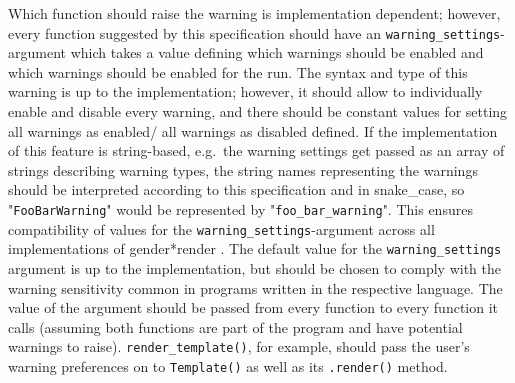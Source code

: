 \documentclass{article}
\newcommand{\GenderRender}{
    gender*render
}
\begin{document}
    Which function should raise the warning is implementation dependent;
    however, every function suggested by this specification should have an \texttt{warning\_settings}-argument which takes a value defining which warnings should be enabled and which warnings should be enabled for the run.
    The syntax and type of this warning is up to the implementation;
    however, it should allow to individually enable and disable every warning, and there should be constant values for setting all warnings as enabled/ all warnings as disabled defined.
    If the implementation of this feature is string-based, e.g.\ the warning settings get passed as an array of strings describing warning types, the string names representing the warnings should be interpreted according to this specification and in snake\_case, so "\texttt{FooBarWarning}" would be represented by  "\texttt{foo\_bar\_warning}".
    This ensures compatibility of values for the \texttt{warning\_settings}-argument across all implementations of \GenderRender.
    The default value for the \texttt{warning\_settings} argument is up to the implementation, but should be chosen to comply with the warning sensitivity common in programs written in the respective language.
    The value of the argument should be passed from every function to every function it calls (assuming both functions are part of the program and have potential warnings to raise).
    \texttt{render\_template()}, for example, should pass the user's warning preferences on to \texttt{Template()} as well as its \texttt{.render()} method.\\
\end{document}
